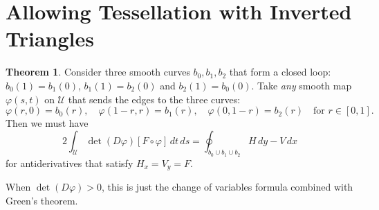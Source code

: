 \documentclass[letterpaper,10pt]{article}
\theoremstyle{definition}
\newtheorem{theorem}{Theorem}[section]
\newcommand{\utri}{\mathcal{U}}
\begin{document}
\section{Allowing Tessellation with Inverted Triangles}

\begin{theorem}\label{theorem:bad-triangle}
Consider three smooth curves
\(b_0, b_1, b_2\) that form a closed loop: \(b_0(1) = b_1(0)\),
\(b_1(1) = b_2(0)\) and \(b_2(1) = b_0(0)\).
Take \emph{any} smooth map \(\varphi(s, t)\) on \(\utri\) that
sends the edges to the three curves:
\begin{equation}
\varphi(r, 0) = b_0(r), \quad \varphi(1 - r, r) = b_1(r),
  \quad \varphi(0, 1 - r) = b_2(r) \quad \text{for } r \in \left[0, 1\right].
\end{equation}
Then we must have
\begin{equation}
2 \int_{\utri} \det(D\varphi) \left[F \circ \varphi\right] \, dt \, ds =
\oint_{b_0 \cup b_1 \cup b_2} H \, dy - V \, dx
\end{equation}
for antiderivatives that satisfy \(H_x = V_y = F\).

When \(\det(D\varphi) > 0\), this is just the change of variables
formula combined with Green's theorem.
\end{theorem}
\end{document}
